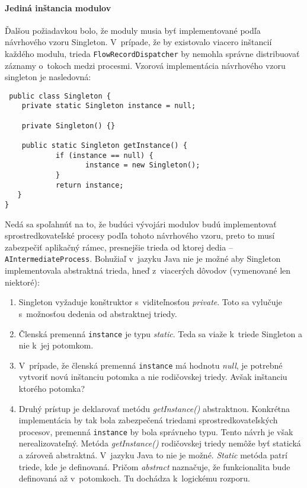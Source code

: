 \paragraph{Jediná inštancia modulov} \label{sec:singleton}
Ďalšou požiadavkou bolo, že moduly musia byť implementované podľa návrhového vzoru Singleton. V~prípade, že
by existovalo viacero inštancií každého modulu, trieda \verb|FlowRecordDispatcher| by nemohla správne 
distribuovať záznamy o~tokoch medzi procesmi. Vzorová implementácia návrhového
vzoru singleton je nasledovná:  
\begin{verbatim}
 public class Singleton {
    private static Singleton instance = null;
 
    private Singleton() {}
 
    public static Singleton getInstance() {
            if (instance == null) {
                   instance = new Singleton();
            }
            return instance;
   }
}
\end{verbatim}
Nedá sa spoľahnúť na to, že budúci vývojári modulov budú implementovať sprostredkovateľské procesy 
podľa tohoto návrhového vzoru, preto to musí zabezpečiť aplikačný rámec, presnejšie trieda od ktorej 
dedia -- \verb|AIntermediateProcess|.
Bohužiaľ v~jazyku Java nie je možné aby Singleton implementovala abstraktná trieda, hneď z~viacerých
dôvodov (vymenované len niektoré):
\begin{enumerate}
 \item Singleton vyžaduje konštruktor s~viditeľnosťou \emph{private}. Toto sa vylučuje s~možnosťou 
 dedenia od abstraktnej triedy.
 \item Členská premenná \verb|instance| je typu \emph{static}. Teda sa viaže k~triede Singleton a nie k~jej 
 potomkom.
 \item V~prípade, že členská premenná \verb|instance| má hodnotu \emph{null}, je potrebné vytvoriť novú inštanciu 
 potomka a nie rodičovskej triedy. Avšak inštanciu ktorého potomka?
 \item Druhý prístup je deklarovať metódu \emph{getInstance()} abstraktnou. Konkrétna implementácia 
 by tak bola zabezpečená triedami sprostredkovateľských procesov, premenná \verb|instance|
 by bola správneho typu. Tento návrh je však nerealizovateľný. 
 Metóda \emph{getInstance()} rodičovskej triedy nemôže byť statická a zároveň abstraktná. V~jazyku Java
 to nie je možné. 
 \emph{Static} metóda patrí triede, kde je definovaná. 
 Pričom \emph{abstract} naznačuje, že funkcionalita bude definovaná až v~potomkoch. Tu dochádza
k~logickému rozporu.
\end{enumerate}
